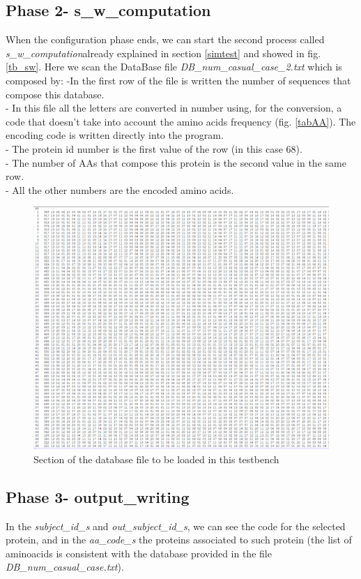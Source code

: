 \subsection{Phase 2- s\_w\_computation}
When the configuration phase ends, we can start the second process called \textit{s\_w\_computation}already explained in section \ref{simtest} and showed in fig. \ref{tb_sw}.
Here we scan the DataBase file \textit{DB\_num\_casual\_case\_2.txt} which is composed by:
 -In the first row of the file is written the number of sequences that compose this database.\\
 - In this file all the letters are converted in number using, for the conversion, a code that doesn't  take into account   the amino acids frequency (fig. \ref{tabAA}).
  The encoding code is written directly into the program.\\
   - The protein id number is the first value of the row (in this case 68). \\
   - The number of AAs that compose this protein is the second value in the same row.\\
    - All the other numbers are the encoded amino acids.
\begin{figure}[h!]
	\centering
	\includegraphics[width=\textwidth]{imm/sw/db.png}
	\caption{Section of the database file to be loaded in this testbench} 
	\label{db}
\end{figure}
\clearpage
\subsection{Phase 3- output\_writing}
In the \textit{subject\_id\_s} and \textit{out\_subject\_id\_s}, we can see the code for the selected protein, and in the \textit{aa\_code\_s} the proteins associated to such protein (the list of aminoacids is consistent with the database provided in the file \textit{DB\_num\_casual\_case.txt}).

